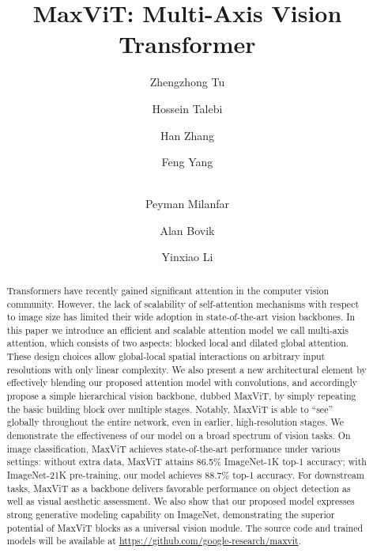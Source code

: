 \documentclass[runningheads]{llncs}
\begin{document}
\pagestyle{headings}
\mainmatter
\def\ECCVSubNumber{3370}  

\title{MaxViT: Multi-Axis Vision Transformer}


\begin{comment}
\titlerunning{ECCV-22 submission ID \ECCVSubNumber} 
\authorrunning{ECCV-22 submission ID \ECCVSubNumber} 
\author{Anonymous ECCV submission}
\institute{Paper ID \ECCVSubNumber}
\end{comment}


\author{Zhengzhong Tu \and
Hossein Talebi \and
Han Zhang \and
Feng Yang \and \\
Peyman Milanfar \and
Alan Bovik \and
Yinxiao Li}
\maketitle

\begin{abstract}
Transformers have recently gained significant attention in the computer vision community.
However, the lack of scalability of self-attention mechanisms with respect to image size has limited their wide adoption in state-of-the-art vision backbones.
In this paper we introduce an efficient and scalable attention model we call multi-axis attention, which consists of two aspects: blocked local and dilated global attention. These design choices allow global-local spatial interactions on arbitrary input resolutions with only linear complexity.
We also present a new architectural element by effectively blending our proposed attention model with convolutions, and accordingly propose a simple hierarchical vision backbone, dubbed MaxViT, by simply repeating the basic building block over multiple stages.
Notably, MaxViT is able to ``see'' globally throughout the entire network, even in earlier, high-resolution stages.
We demonstrate the effectiveness of our model on a broad spectrum of vision tasks.
On image classification, MaxViT achieves state-of-the-art performance under various settings: without extra data, MaxViT attains 86.5\% ImageNet-1K top-1 accuracy; with ImageNet-21K pre-training, our model achieves 88.7\% top-1 accuracy.
For downstream tasks, MaxViT as a backbone delivers favorable performance on object detection as well as visual aesthetic assessment.
We also show that our proposed model expresses strong generative modeling capability on ImageNet, demonstrating the superior potential of MaxViT blocks as a universal vision module.
The source code and trained models will be available at \url{https://github.com/google-research/maxvit}.

\end{abstract}
\end{document}
